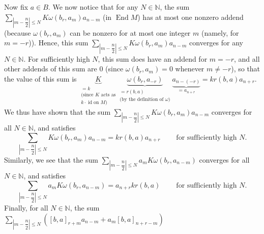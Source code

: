 \documentclass[etingof-lie.tex]{subfiles}
\begin{document}
Now fix $a\in B$. We now notice that for any $N\in\mathbb{N}$, the sum
$\sum\limits_{\left\vert m-\dfrac{n}{2}\right\vert \leq N}K\omega\left(
b_{r},a_{m}\right)  a_{n-m}$ (in $\operatorname*{End}M$) has at most one
nonzero addend (because $\omega\left(  b_{r},a_{m}\right)  $ can be nonzero
for at most one integer $m$ (namely, for $m=-r$)). Hence, this sum
$\sum\limits_{\left\vert m-\dfrac{n}{2}\right\vert \leq N}K\omega\left(
b_{r},a_{m}\right)  a_{n-m}$ converges for any $N\in\mathbb{N}$. For
sufficiently high $N$, this sum does have an addend for $m=-r$, and all other
addends of this sum are $0$ (since $\omega\left(  b_{r},a_{m}\right)  =0$
whenever $m\neq-r$), so that the value of this sum is $\underbrace{K}%
_{\substack{=k\\\text{(since }K\text{ acts as}\\k\cdot\operatorname*{id}\text{
on }M\text{)}}}\underbrace{\omega\left(  b_{r},a_{-r}\right)  }%
_{\substack{=r\left(  b,a\right)  \\\text{(by the definition of }%
\omega\text{)}}}\underbrace{a_{n-\left(  -r\right)  }}_{=a_{n+r}}=kr\left(
b,a\right)  a_{n+r}$. We thus have shown that the sum $\sum\limits_{\left\vert
m-\dfrac{n}{2}\right\vert \leq N}K\omega\left(  b_{r},a_{m}\right)  a_{n-m}$
converges for all $N\in\mathbb{N}$, and satisfies%
\begin{equation}
\sum\limits_{\left\vert m-\dfrac{n}{2}\right\vert \leq N}K\omega\left(
b_{r},a_{m}\right)  a_{n-m}=kr\left(  b,a\right)  a_{n+r}%
\ \ \ \ \ \ \ \ \ \ \text{for sufficiently high }N\text{.}
\label{pf.sugawara.b.2a}%
\end{equation}
Similarly, we see that the sum $\sum\limits_{\left\vert m-\dfrac{n}%
{2}\right\vert \leq N}a_{m}K\omega\left(  b_{r},a_{n-m}\right)  $ converges
for all $N\in\mathbb{N}$, and satisfies%
\begin{equation}
\sum\limits_{\left\vert m-\dfrac{n}{2}\right\vert \leq N}a_{m}K\omega\left(
b_{r},a_{n-m}\right)  =a_{n+r}kr\left(  b,a\right)
\ \ \ \ \ \ \ \ \ \ \text{for sufficiently high }N\text{.}
\label{pf.sugawara.b.2b}%
\end{equation}
Finally, for all $N\in\mathbb{N}$, the sum $\sum\limits_{\left\vert
m-\dfrac{n}{2}\right\vert \leq N}\left(  \left[  b,a\right]  _{r+m}%
a_{n-m}+a_{m}\left[  b,a\right]  _{n+r-m}\right)  $
\end{document}
